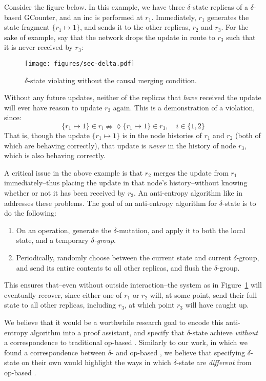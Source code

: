 Consider the figure below. In this example, we have three $\delta$-state \CRDT
replicas of a $\delta$-based GCounter, and an \textsf{inc} is performed at
$r_1$. Immediately, $r_1$ generates the state fragment $\{ r_1 \mapsto 1 \}$,
and sends it to the other replicas, $r_2$ and $r_3$. For the sake of example,
say that the network drops the update in route to $r_3$ such that it is never
received by $r_3$:

\begin{figure}[H]
  \centering
  \texttt{[image: figures/sec-delta.pdf]}
  \caption{$\delta$-state \CRDTs violating \SEC without the causal merging
    condition.}
  \label{fig:delta-sec-violation}
\end{figure}

Without any future updates, neither of the replicas that \emph{have} received
the update will ever have reason to update $r_3$ again. This is a demonstration
of a \SEC violation, since:
\[
  \{ r_1 \mapsto 1 \} \in r_i \nRightarrow \lozenge \{ r_1 \mapsto 1 \} \in r_3,
  \quad i \in \{ 1, 2 \}
\]
That is, though the update $\{ r_1 \mapsto 1 \}$ is in the node histories of
$r_1$ and $r_2$ (both of which are behaving correctly), that update is
\emph{never} in the history of node $r_3$, which is also behaving correctly.

A critical issue in the above example is that $r_2$ merges the update from $r_1$
immediately--thus placing the update in that node's history--without knowing
whether or not it has been received by $r_3$. An anti-entropy algorithm like
in~\citet{almedia18} addresses these problems. The goal of an anti-entropy
algorithm for $\delta$-state \CRDTs is to do the following:
\begin{enumerate}
  \item On an operation, generate the $\delta$-mutation, and apply it to both
    the local state, and a temporary \emph{$\delta$-group}.
  \item Periodically, randomly choose between the current state and current
    $\delta$-group, and send its entire contents to all other replicas, and
    flush the $\delta$-group.
\end{enumerate}
This ensures that--even without outside interaction--the system as in
Figure~\ref{fig:delta-sec-violation} will eventually recover, since either one
of $r_1$ or $r_2$ will, at some point, send their full state to all other
replicas, including $r_3$, at which point $r_3$ will have caught up.

We believe that it would be a worthwhile research goal to encode this
anti-entropy algorithm into a proof assistant, and specify that $\delta$-state
\CRDTs achieve \SEC \emph{without} a correspondence to traditional op-based
\CRDTs. Similarly to our work, in which we found a correspondence between
$\delta$- and op-based \CRDTs, we believe that specifying $\delta$-state \CRDTs
on their own would highlight the ways in which $\delta$-state \CRDTs are
\emph{different} from op-based \CRDTs.

